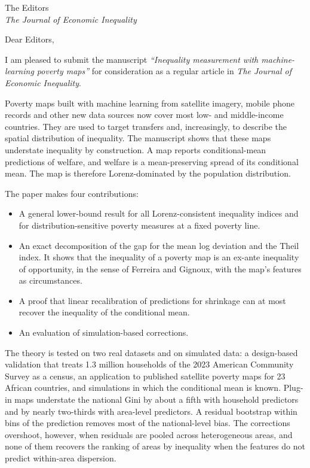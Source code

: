 \documentclass[10pt,a4paper]{letter}
\begin{document}
\begin{letter}{The Editors\\
\textit{The Journal of Economic Inequality}}

\opening{Dear Editors,}

I am pleased to submit the manuscript \textit{``Inequality measurement with machine-learning poverty maps''} for consideration as a regular article in \textit{The Journal of Economic Inequality}.

Poverty maps built with machine learning from satellite imagery, mobile phone records and other new data sources now cover most low- and middle-income countries. They are used to target transfers and, increasingly, to describe the spatial distribution of inequality. The manuscript shows that these maps understate inequality by construction. A map reports conditional-mean predictions of welfare, and welfare is a mean-preserving spread of its conditional mean. The map is therefore Lorenz-dominated by the population distribution.

The paper makes four contributions:
\begin{itemize}\setlength{\itemsep}{0pt}
\item A general lower-bound result for all Lorenz-consistent inequality indices and for distribution-sensitive poverty measures at a fixed poverty line.
\item An exact decomposition of the gap for the mean log deviation and the Theil index. It shows that the inequality of a poverty map is an ex-ante inequality of opportunity, in the sense of Ferreira and Gignoux, with the map's features as circumstances.
\item A proof that linear recalibration of predictions for shrinkage can at most recover the inequality of the conditional mean.
\item An evaluation of simulation-based corrections.
\end{itemize}

The theory is tested on two real datasets and on simulated data: a design-based validation that treats 1.3 million households of the 2023 American Community Survey as a census, an application to published satellite poverty maps for 23 African countries, and simulations in which the conditional mean is known. Plug-in maps understate the national Gini by about a fifth with household predictors and by nearly two-thirds with area-level predictors. A residual bootstrap within bins of the prediction removes most of the national-level bias. The corrections overshoot, however, when residuals are pooled across heterogeneous areas, and none of them recovers the ranking of areas by inequality when the features do not predict within-area dispersion.


\end{letter}
\end{document}
